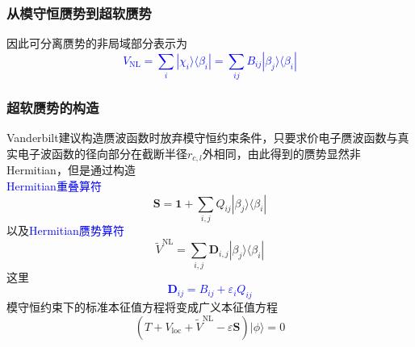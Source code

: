 \frame
{
	\frametitle{从模守恒赝势到超软赝势}
	因此可分离赝势的非局域部分表示为
	\textcolor{blue}{\begin{displaymath}
		V_{\mathrm{NL}}=\sum_i|\chi_i\rangle\langle\beta_i|=\sum_{ij}B_{ij}|\beta_j\rangle\langle\beta_i|
	\end{displaymath}}
	{\fontsize{7.2pt}{5.2pt}}
}

\frame
{
\frametitle{超软赝势的构造}
\textrm{Vanderbilt}建议构造赝波函数时放弃模守恒约束条件，只要求价电子赝波函数与真实电子波函数的径向部分在截断半径$r_{c,l}$外相同，由此得到的赝势显然非\textrm{Hermitian}，但是通过构造\\\textcolor{blue}{\textrm{Hermitian}重叠算符}
\begin{displaymath}
	\mathbf{S}=\mathbf{1}+\sum_{i,j}Q_{ij}|\beta_j\rangle\langle\beta_i|
\end{displaymath}
以及\textcolor{blue}{\textrm{Hermitian}赝势算符}
\begin{displaymath}
	\tilde V^{\mathrm{NL}}=\sum_{i,j}\mathbf{D}_{i,j}|\beta_j\rangle\langle\beta_i|
\end{displaymath}
这里\textcolor{blue}{
\begin{displaymath}
	\mathbf{D}_{ij}=B_{ij}+\varepsilon_iQ_{ij}
\end{displaymath}}
模守恒约束下的标准本征值方程将变成广义本征值方程
\begin{displaymath}
	(T+V_{\mathrm{loc}}+\tilde V^{\mathrm{NL}}-\varepsilon\mathbf{S})|\phi\rangle=0
\end{displaymath}
}

